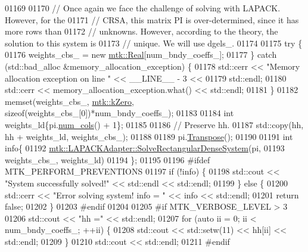 \begin{DoxyCode}
{{01169 
01170   \textcolor{comment}{// Once again we face the challenge of solving with LAPACK. However, for the}
01171   \textcolor{comment}{// CRSA, this matrix PI is over-determined, since it has more rows than}
01172   \textcolor{comment}{// unknowns. However, according to the theory, the solution to this system is}
01173   \textcolor{comment}{// unique. We will use dgels\_.}
01174 
01175   \textcolor{keywordflow}{try} \{
01176     weights\_cbs\_ = \textcolor{keyword}{new} \hyperlink{group__c01-roots_gac080bbbf5cbb5502c9f00405f894857d}{mtk::Real}[num\_bndy\_coeffs\_];
01177   \} \textcolor{keywordflow}{catch} (std::bad\_alloc &memory\_allocation\_exception) \{
01178     std::cerr << \textcolor{stringliteral}{"Memory allocation exception on line "} << \_\_LINE\_\_ - 3 <<
01179       std::endl;
01180     std::cerr << memory\_allocation\_exception.what() << std::endl;
01181   \}
01182   memset(weights\_cbs\_, \hyperlink{group__c01-roots_ga59a451a5fae30d59649bcda274fea271}{mtk::kZero}, \textcolor{keyword}{sizeof}(weights\_cbs\_[0])*num\_bndy\_coeffs\_);
01183 
01184   \textcolor{keywordtype}{int} weights\_ld\{pi.\hyperlink{classmtk_1_1DenseMatrix_a41747502d468c6728a4be31501b16e0e}{num\_cols}() + 1\};
01185 
01186   \textcolor{comment}{// Preserve hh.}
01187   std::copy(hh, hh + weights\_ld, weights\_cbs\_);
01188 
01189   pi.\hyperlink{classmtk_1_1DenseMatrix_a71d9c07ca66e88d97d1fd5012f43138b}{Transpose}();
01190 
01191   \textcolor{keywordtype}{int} info\{
01192     \hyperlink{classmtk_1_1LAPACKAdapter_a380f148ffdf96bae2f79ae28f1a6560c}{mtk::LAPACKAdapter::SolveRectangularDenseSystem}(pi,
01193                                                     weights\_cbs\_, weights\_ld)
01194   \};
01195 
01196 \textcolor{preprocessor}{  #ifdef MTK\_PERFORM\_PREVENTIONS}
01197   \textcolor{keywordflow}{if} (!info) \{
01198     std::cout << \textcolor{stringliteral}{"System successfully solved!"} << std::endl << std::endl;
01199   \} \textcolor{keywordflow}{else} \{
01200     std::cerr << \textcolor{stringliteral}{"Error solving system! info = "} << info << std::endl;
01201     \textcolor{keywordflow}{return} \textcolor{keyword}{false};
01202   \}
01203 \textcolor{preprocessor}{  #endif}
01204 
01205 \textcolor{preprocessor}{  #if MTK\_VERBOSE\_LEVEL > 3}
01206   std::cout << \textcolor{stringliteral}{"hh ="} << std::endl;
01207   \textcolor{keywordflow}{for} (\textcolor{keyword}{auto} ii = 0; ii < num\_bndy\_coeffs\_; ++ii) \{
01208     std::cout << std::setw(11) << hh[ii] << std::endl;
01209   \}
01210   std::cout << std::endl;
01211 \textcolor{preprocessor}{  #endif}
}}
\end{DoxyCode}
